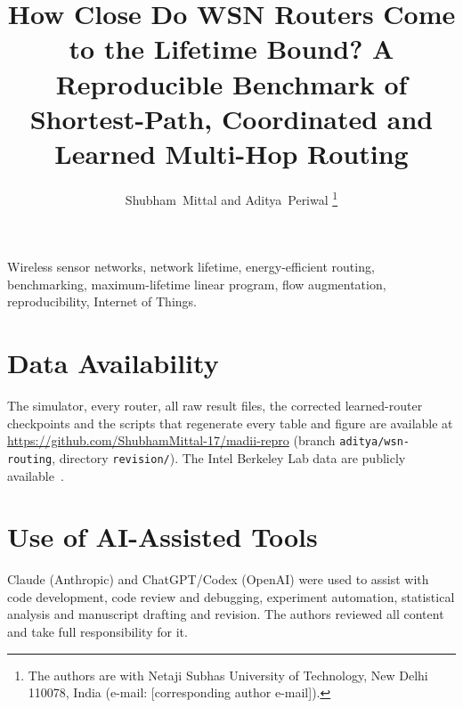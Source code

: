 \documentclass[journal]{IEEEtran}
\begin{document}
\title{How Close Do WSN Routers Come to the Lifetime Bound? A Reproducible Benchmark of Shortest-Path, Coordinated and Learned Multi-Hop Routing}

\author{Shubham~Mittal and Aditya~Periwal%
\thanks{The authors are with Netaji Subhas University of Technology, New Delhi 110078, India (e-mail: [corresponding author e-mail]).}}

\maketitle

\begin{abstract}

\end{abstract}

\begin{IEEEkeywords}
Wireless sensor networks, network lifetime, energy-efficient routing, benchmarking, maximum-lifetime linear program, flow augmentation, reproducibility, Internet of Things.
\end{IEEEkeywords}











\section*{Data Availability}
The simulator, every router, all raw result files, the corrected learned-router checkpoints and the scripts that regenerate every table and figure are available at \url{https://github.com/ShubhamMittal-17/madii-repro} (branch \texttt{aditya/wsn-routing}, directory \texttt{revision/}). The Intel Berkeley Lab data are publicly available~\cite{intellab2004}.

\section*{Use of AI-Assisted Tools}
Claude (Anthropic) and ChatGPT/Codex (OpenAI) were used to assist with code development, code review and debugging, experiment automation, statistical analysis and manuscript drafting and revision. The authors reviewed all content and take full responsibility for it.



\end{document}
